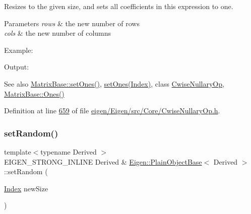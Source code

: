 Resizes to the given size, and sets all coefficients in this expression to one.


\begin{DoxyParams}{Parameters}
{\em rows} & the new number of rows \\
\hline
{\em cols} & the new number of columns\\
\hline
\end{DoxyParams}
Example\+: 
\begin{DoxyCodeInclude}
\end{DoxyCodeInclude}
 Output\+: 
\begin{DoxyVerbInclude}
\end{DoxyVerbInclude}


\begin{DoxySeeAlso}{See also}
\hyperlink{group___core___module_ad18970fd7d9f9c3d8db9d05fa8652a25}{Matrix\+Base\+::set\+Ones()}, \hyperlink{class_eigen_1_1_plain_object_base_a2871e88e1feb1cc665fa1f1cc800078b}{set\+Ones(\+Index)}, class \hyperlink{group___core___module_class_eigen_1_1_cwise_nullary_op}{Cwise\+Nullary\+Op}, \hyperlink{group___core___module_a1284a38971d817c33e40c226f6347e37}{Matrix\+Base\+::\+Ones()} 
\end{DoxySeeAlso}


Definition at line \hyperlink{eigen_2_eigen_2src_2_core_2_cwise_nullary_op_8h_source_l00659}{659} of file \hyperlink{eigen_2_eigen_2src_2_core_2_cwise_nullary_op_8h_source}{eigen/\+Eigen/src/\+Core/\+Cwise\+Nullary\+Op.\+h}.

\mbox{\label{class_eigen_1_1_plain_object_base_af0e576a0e1aefc9ee346de44cc352ba3}} 
\subsubsection{\texorpdfstring{set\+Random()}{setRandom()}\hspace{0.1cm}{\footnotesize\ttfamily [1/2]}}
{\footnotesize\ttfamily template$<$typename Derived $>$ \\
E\+I\+G\+E\+N\+\_\+\+S\+T\+R\+O\+N\+G\+\_\+\+I\+N\+L\+I\+NE Derived \& \hyperlink{class_eigen_1_1_plain_object_base}{Eigen\+::\+Plain\+Object\+Base}$<$ Derived $>$\+::set\+Random (\begin{DoxyParamCaption}\item[{\hyperlink{namespace_eigen_a62e77e0933482dafde8fe197d9a2cfde}{Index}}]{new\+Size }\end{DoxyParamCaption})}

